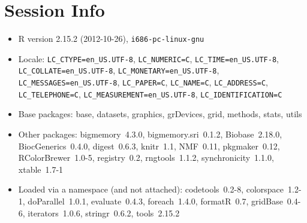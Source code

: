 \documentclass[a4paper]{article}\usepackage{graphicx, color}
\begin{document}
\section{Session Info}
\begin{itemize}\raggedright
  \item R version 2.15.2 (2012-10-26), \verb|i686-pc-linux-gnu|
  \item Locale: \verb|LC_CTYPE=en_US.UTF-8|, \verb|LC_NUMERIC=C|, \verb|LC_TIME=en_US.UTF-8|, \verb|LC_COLLATE=en_US.UTF-8|, \verb|LC_MONETARY=en_US.UTF-8|, \verb|LC_MESSAGES=en_US.UTF-8|, \verb|LC_PAPER=C|, \verb|LC_NAME=C|, \verb|LC_ADDRESS=C|, \verb|LC_TELEPHONE=C|, \verb|LC_MEASUREMENT=en_US.UTF-8|, \verb|LC_IDENTIFICATION=C|
  \item Base packages: base, datasets, graphics,
    grDevices, grid, methods, stats, utils
  \item Other packages: bigmemory~4.3.0,
    bigmemory.sri~0.1.2, Biobase~2.18.0,
    BiocGenerics~0.4.0, digest~0.6.3, knitr~1.1,
    NMF~0.11, pkgmaker~0.12, RColorBrewer~1.0-5,
    registry~0.2, rngtools~1.1.2,
    synchronicity~1.1.0, xtable~1.7-1
  \item Loaded via a namespace (and not attached):
    codetools~0.2-8, colorspace~1.2-1,
    doParallel~1.0.1, evaluate~0.4.3, foreach~1.4.0,
    formatR~0.7, gridBase~0.4-6, iterators~1.0.6,
    stringr~0.6.2, tools~2.15.2
\end{itemize}



\printbibliography[heading=bibintoc]
\end{document}
